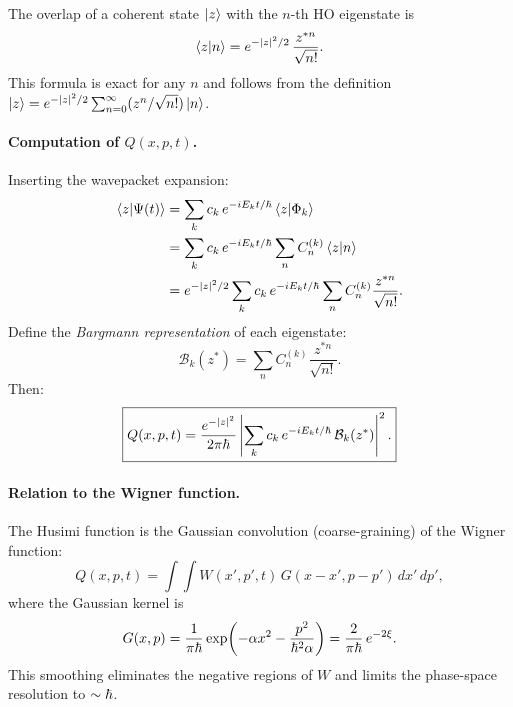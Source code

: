 The overlap of a coherent state $\ket{z}$ with the $n$-th HO eigenstate is
\begin{equation}\label{eq:coh_overlap}
  \braket{z}{n} = e^{-|z|^2/2}\,\frac{z^{*n}}{\sqrt{n!}}.
\end{equation}
This formula is exact for any $n$ and follows from the definition $\ket{z} = e^{-|z|^2/2}\sum_{n=0}^{\infty}(z^n/\sqrt{n!})\ket{n}$.

\paragraph{Computation of $Q(x,p,t)$.}

Inserting the wavepacket expansion:
\begin{align}
  \braket{z}{\Psi(t)}
  &= \sum_k c_k\,e^{-iE_k t/\hbar}\braket{z}{\Phi_k}\notag\\
  &= \sum_k c_k\,e^{-iE_k t/\hbar}\sum_n C_n^{(k)}\braket{z}{n}\notag\\
  &= e^{-|z|^2/2}\sum_k c_k\,e^{-iE_k t/\hbar}\sum_n C_n^{(k)}\frac{z^{*n}}{\sqrt{n!}}.
  \label{eq:husimi_expansion}
\end{align}
Define the \emph{Bargmann representation} of each eigenstate:
\begin{equation}\label{eq:bargmann}
  \mathcal{B}_k(z^*) = \sum_n C_n^{(k)}\frac{z^{*n}}{\sqrt{n!}}.
\end{equation}
Then:
\begin{equation}\label{eq:Q_final}
  \boxed{Q(x,p,t) = \frac{e^{-|z|^2}}{2\pi\hbar}\left|\sum_k c_k\,e^{-iE_k t/\hbar}\,\mathcal{B}_k(z^*)\right|^2.}
\end{equation}

\paragraph{Relation to the Wigner function.}

The Husimi function is the Gaussian convolution (coarse-graining) of the Wigner function:
\begin{equation}\label{eq:Q_W_relation}
  Q(x,p,t) = \int\!\!\int W(x',p',t)\,G(x-x',p-p')\,dx'\,dp',
\end{equation}
where the Gaussian kernel is
\begin{equation}
  G(x,p) = \frac{1}{\pi\hbar}\exp\!\left(-\alpha x^2 - \frac{p^2}{\hbar^2\alpha}\right)
  = \frac{2}{\pi\hbar}\,e^{-2\xi}.
\end{equation}
This smoothing eliminates the negative regions of $W$ and limits the phase-space resolution to $\sim\hbar$.

